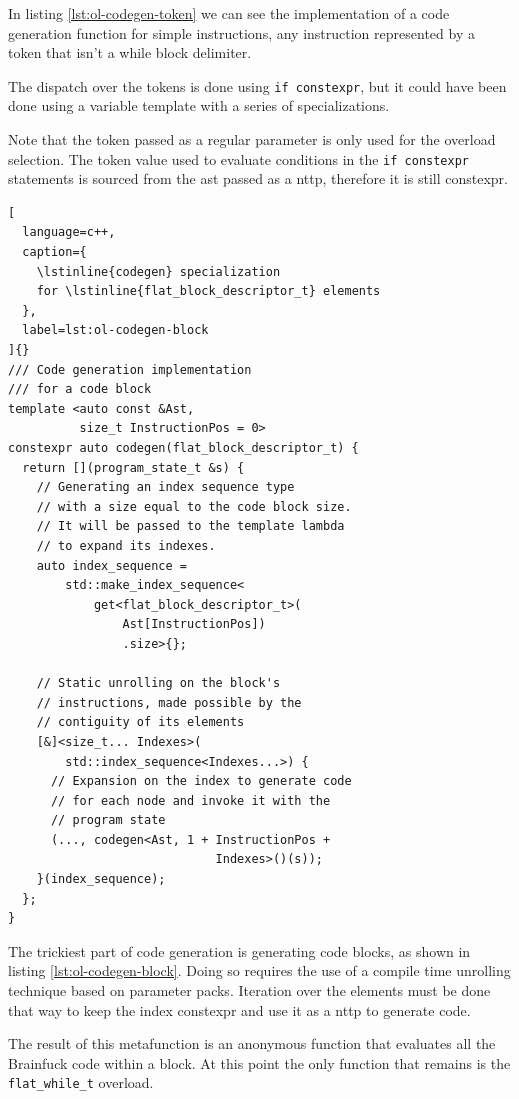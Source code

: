 \documentclass[../main]{subfiles}
\begin{document}
\begin{itemize}
In listing \ref{lst:ol-codegen-token} we can see the implementation of a
code generation function for simple instructions, \ie any instruction
represented by a token that isn't a while block delimiter.

The dispatch over the tokens is done using \lstinline{if constexpr},
but it could have been done using a variable template with
a series of specializations.

Note that the token passed as a regular parameter is only used for the overload
selection. The token value used to evaluate conditions in the
\lstinline{if constexpr} statements is sourced from the \gls{ast} passed as a
\gls{nttp}, therefore it is still \gls{constexpr}.

\begin{lstlisting}[
  language=c++,
  caption={
    \lstinline{codegen} specialization
    for \lstinline{flat_block_descriptor_t} elements
  },
  label=lst:ol-codegen-block
]{}
/// Code generation implementation
/// for a code block
template <auto const &Ast,
          size_t InstructionPos = 0>
constexpr auto codegen(flat_block_descriptor_t) {
  return [](program_state_t &s) {
    // Generating an index sequence type
    // with a size equal to the code block size.
    // It will be passed to the template lambda
    // to expand its indexes.
    auto index_sequence =
        std::make_index_sequence<
            get<flat_block_descriptor_t>(
                Ast[InstructionPos])
                .size>{};

    // Static unrolling on the block's
    // instructions, made possible by the
    // contiguity of its elements
    [&]<size_t... Indexes>(
        std::index_sequence<Indexes...>) {
      // Expansion on the index to generate code
      // for each node and invoke it with the
      // program state
      (..., codegen<Ast, 1 + InstructionPos +
                             Indexes>()(s));
    }(index_sequence);
  };
}
\end{lstlisting}

The trickiest part of code generation is generating code blocks, as shown in
listing \ref{lst:ol-codegen-block}. Doing so requires the use of a compile time
unrolling technique based on \cpp parameter packs.
Iteration over the elements must be done that way to keep the index
\gls{constexpr} and use it as a \gls{nttp} to generate code.

The result of this metafunction is an anonymous function that evaluates all the
Brainfuck code within a block. At this point the only function that remains
is the \lstinline{flat_while_t} overload.


\end{itemize}
\end{document}
